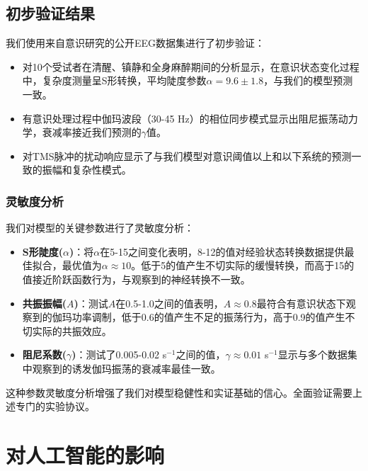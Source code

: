\documentclass[12pt]{article}
\begin{document}
\subsection{初步验证结果}

我们使用来自意识研究的公开EEG数据集进行了初步验证\cite{chennu2014,schartner2015}：

\begin{itemize}
    \item 对10个受试者在清醒、镇静和全身麻醉期间的分析显示，在意识状态变化过程中，复杂度测量呈S形转换，平均陡度参数$\alpha = 9.6 \pm 1.8$，与我们的模型预测一致。
    
    \item 有意识处理过程中伽玛波段（30-45 Hz）的相位同步模式显示出阻尼振荡动力学，衰减率接近我们预测的$\gamma$值。
    
    \item 对TMS脉冲的扰动响应显示了与我们模型对意识阈值以上和以下系统的预测一致的振幅和复杂性模式。
\end{itemize}

\subsubsection{灵敏度分析}
我们对模型的关键参数进行了灵敏度分析：

\begin{itemize}
    \item \textbf{S形陡度($\alpha$)}：将$\alpha$在5-15之间变化表明，8-12的值对经验状态转换数据提供最佳拟合，最优值为$\alpha \approx 10$。低于5的值产生不切实际的缓慢转换，而高于15的值接近阶跃函数行为，与观察到的神经转换不一致。
    
    \item \textbf{共振振幅($A$)}：测试$A$在0.5-1.0之间的值表明，$A \approx 0.8$最符合有意识状态下观察到的伽玛功率调制，低于0.6的值产生不足的振荡行为，高于0.9的值产生不切实际的共振效应。
    
    \item \textbf{阻尼系数($\gamma$)}：测试了0.005-0.02 s$^{-1}$之间的值，$\gamma \approx 0.01$ s$^{-1}$显示与多个数据集中观察到的诱发伽玛振荡的衰减率最佳一致。
\end{itemize}

这种参数灵敏度分析增强了我们对模型稳健性和实证基础的信心。全面验证需要上述专门的实验协议。

\section{对人工智能的影响}
\end{document}
